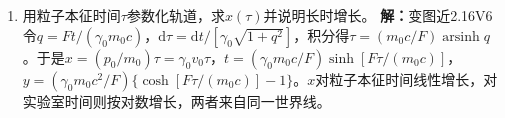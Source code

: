 \documentclass[UTF8,fontset=fandol,a4paper,11pt]{ctexart}
\begin{document}
\begin{enumerate}
\item 用粒子本征时间$\tau$参数化轨道，求$x(\tau)$并说明长时增长。
\textbf{解：}变图近2.16V6令$q=Ft/(\gamma_0m_0c)$，$\mathrm d\tau=\mathrm dt/[\gamma_0\sqrt{1+q^2}]$，积分得$\tau=(m_0c/F)\operatorname{arsinh}q$。于是$x=(p_0/m_0)\tau=\gamma_0v_0\tau$，$t=(\gamma_0m_0c/F)\sinh[F\tau/(m_0c)]$，$y=(\gamma_0m_0c^2/F)\{\cosh[F\tau/(m_0c)]-1\}$。$x$对粒子本征时间线性增长，对实验室时间则按对数增长，两者来自同一世界线。
\begin{center}\begin{minipage}{.98\linewidth}\centering
{}
\end{minipage}
\end{center}
\end{enumerate}
\end{document}
